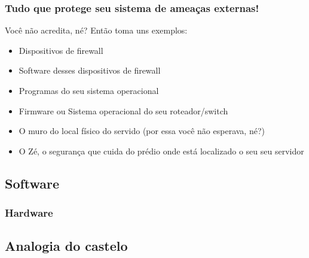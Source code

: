 \begin{frame}

	\frametitle{Tudo que protege seu sistema de ameaças externas!}
	
	Você não acredita, né? Então toma uns exemplos:

	\begin{itemize}
		\item{Dispositivos de firewall}
		\item{Software desses dispositivos de firewall}
		\item{Programas do seu sistema operacional}
		\item{Firmware ou Sistema operacional do seu roteador/switch}
		\item{O muro do local físico do servido (por essa você não esperava, né?)}
		\item{O Zé, o segurança que cuida do prédio onde está localizado o seu seu servidor}
	\end{itemize}

\end{frame}

\subsection{Software}





\subsubsection{Hardware}







\subsection{Analogia do castelo}

